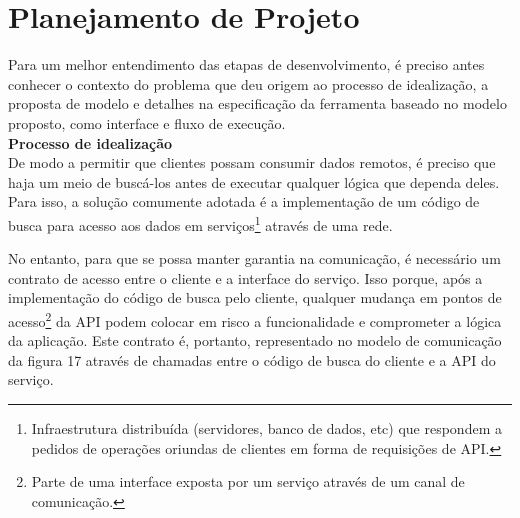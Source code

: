 \section{Planejamento de Projeto}

Para um melhor entendimento das etapas de desenvolvimento, é preciso antes conhecer o contexto do problema que deu origem ao processo de idealização, a proposta de modelo e detalhes na especificação da ferramenta baseado no modelo proposto, como interface e fluxo de execução. \\

\textbf{Processo de idealização} \\

De modo a permitir que clientes possam consumir dados remotos, é preciso que haja um meio de buscá-los antes de executar qualquer lógica que dependa deles. Para isso, a solução comumente adotada é a implementação de um código de busca para acesso aos dados em serviços\footnote{
  Infraestrutura distribuída (servidores, banco de dados, etc) que respondem a pedidos de operações oriundas de clientes em forma de requisições de API.
} através de uma rede.

No entanto, para que se possa manter garantia na comunicação, é necessário um contrato de acesso entre o cliente e a interface do serviço. Isso porque, após a implementação do código de busca pelo cliente, qualquer mudança em pontos de acesso\footnote{
  Parte de uma interface exposta por um serviço através de um canal de comunicação.
} da API podem colocar em risco a funcionalidade e comprometer a lógica da aplicação. Este contrato é, portanto, representado no modelo de comunicação da figura 17 através de chamadas entre o código de busca do cliente e a API do serviço.

